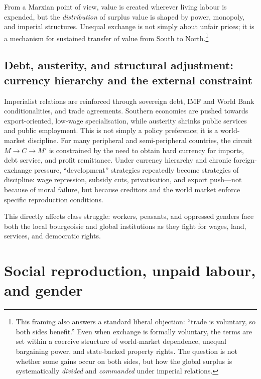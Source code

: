 From a Marxian point of view, value is created wherever living labour is expended, but the \emph{distribution} of surplus value is shaped by power,
monopoly, and imperial structures. Unequal exchange is not simply about unfair prices; it is a mechanism for sustained transfer of value from South to North.\footnote{This framing
also answers a standard liberal objection: ``trade is voluntary, so both sides benefit.'' Even when exchange is formally voluntary, the terms are set within a coercive structure of
world-market dependence, unequal bargaining power, and state-backed property rights. The question is not whether some gains occur on both sides, but how the global surplus is systematically
\emph{divided} and \emph{commanded} under imperial relations.}



\subsection{Debt, austerity, and structural adjustment: currency hierarchy and the external constraint}
\label{sec:debt-austerity-structural-adjustment}

Imperialist relations are reinforced through sovereign debt, IMF and World Bank conditionalities, and trade agreements.
Southern economies are pushed towards export-oriented, low-wage specialisation, while austerity shrinks public services and
public employment.\cite{StrugglePK_WorldPerspectives}
This is not simply a policy preference; it is a world-market discipline. For many peripheral and semi-peripheral countries,
the circuit \(M \rightarrow C \rightarrow M'\) is constrained by the need to obtain hard currency for imports, debt service,
and profit remittance. Under currency hierarchy and chronic foreign-exchange pressure, ``development'' strategies repeatedly
become strategies of discipline: wage repression, subsidy cuts, privatisation, and export push---not because of moral failure,
but because creditors and the world market enforce specific reproduction conditions.\cite{PeetUnholyTrinity,IMFPakistan2023}

This directly affects class struggle: workers, peasants, and oppressed genders face both the local bourgeoisie and global institutions
as they fight for wages, land, services, and democratic rights.

\section{Social reproduction, unpaid labour, and gender}
\label{sec:social-reproduction}

